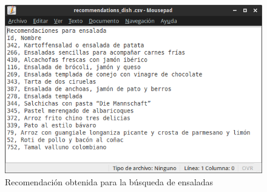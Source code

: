         \begin{figure}[h!]
          \centering
          \includegraphics[width=16cm]{./images/recommendations_dish}
          \caption{Recomendación obtenida para la búsqueda de ensaladas}
          \label{fig:screenshot2 p2}
        \end{figure}
